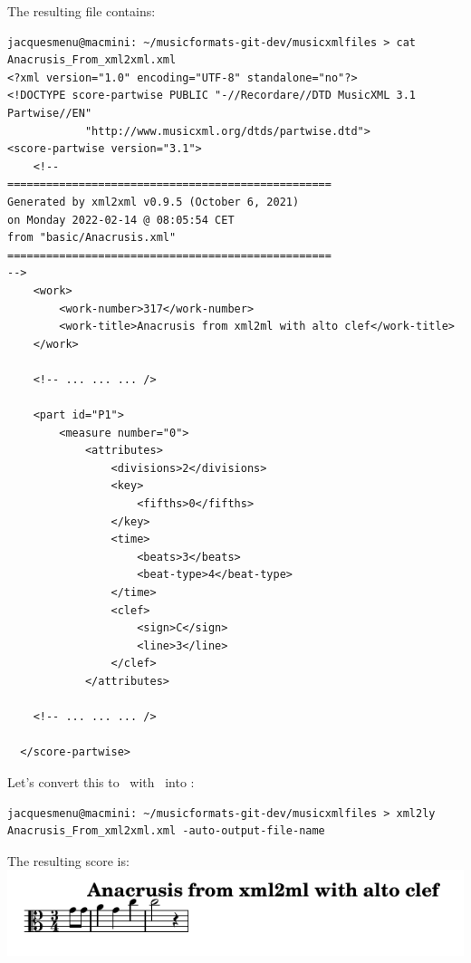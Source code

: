 The resulting file  contains:
\begin{lstlisting}[language=MusicXML]
jacquesmenu@macmini: ~/musicformats-git-dev/musicxmlfiles > cat Anacrusis_From_xml2xml.xml
<?xml version="1.0" encoding="UTF-8" standalone="no"?>
<!DOCTYPE score-partwise PUBLIC "-//Recordare//DTD MusicXML 3.1 Partwise//EN"
			"http://www.musicxml.org/dtds/partwise.dtd">
<score-partwise version="3.1">
    <!--
==================================================
Generated by xml2xml v0.9.5 (October 6, 2021)
on Monday 2022-02-14 @ 08:05:54 CET
from "basic/Anacrusis.xml"
==================================================
-->
    <work>
        <work-number>317</work-number>
        <work-title>Anacrusis from xml2ml with alto clef</work-title>
    </work>

	<!-- ... ... ... />
	
    <part id="P1">
        <measure number="0">
            <attributes>
                <divisions>2</divisions>
                <key>
                    <fifths>0</fifths>
                </key>
                <time>
                    <beats>3</beats>
                    <beat-type>4</beat-type>
                </time>
                <clef>
                    <sign>C</sign>
                    <line>3</line>
                </clef>
            </attributes>

	<!-- ... ... ... />
	
  </score-partwise>
\end{lstlisting}

Let's convert this to \lily\ with \xmlToLy\ into :
\begin{lstlisting}[language=Terminal]
jacquesmenu@macmini: ~/musicformats-git-dev/musicxmlfiles > xml2ly Anacrusis_From_xml2xml.xml -auto-output-file-name
\end{lstlisting}

The resulting score is:\\
\includegraphics[scale=0.7]{../graphics/Anacrusis_From_xml2xml.png}

